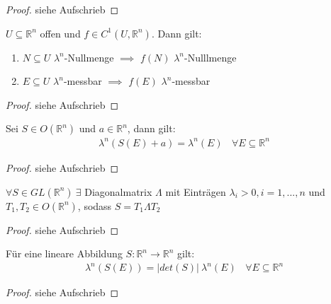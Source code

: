   \begin{proof}
    siehe Aufschrieb
  \end{proof}

  \begin{theorem}
    $U \subseteq \mathbb{R}^n$ offen und $f \in C^1(U, \mathbb{R}^n)$. Dann gilt:
    \begin{enumerate}
      \item $N \subseteq U$ $\lambda^n$-Nullmenge $\implies$ $f(N)$ $\lambda^n$-Nulllmenge
      \item $E \subseteq U$ $\lambda^n$-messbar $\implies$ $f(E)$ $\lambda^n$-messbar
    \end{enumerate}
  \end{theorem}

  \begin{proof}
    siehe Aufschrieb
  \end{proof}

  \begin{theorem}
    Sei $S \in O(\mathbb{R}^n)$ und $a \in \mathbb{R}^n$, dann gilt:
    \begin{align*}
      \lambda^n(S(E) + a) = \lambda^n(E) \ \ \ \ \forall E \subseteq \mathbb{R}^n
    \end{align*}
  \end{theorem}

  \begin{proof}
    siehe Aufschrieb
  \end{proof}

  \begin{lemma}[Polarzerlegung]
    $\forall S \in GL(\mathbb{R}^n) \ \exists$ Diagonalmatrix $\Lambda$ mit Einträgen $\lambda_i > 0, i=1,...,n$ und \\
    $T_1, T_2 \in O(\mathbb{R}^n)$, sodass $S = T_1 \Lambda T_2$ 
  \end{lemma}

  \begin{proof}
    siehe Aufschrieb
  \end{proof}

  \begin{theorem}
    Für eine lineare Abbildung $S: \mathbb{R}^n \to \mathbb{R}^n$ gilt:
    \begin{align*}
      \lambda^n(S(E)) = |det(S)| \ \lambda^n(E) \ \ \ \ \forall E \subseteq \mathbb{R}^n
    \end{align*}
  \end{theorem}

  \begin{proof}
    siehe Aufschrieb
  \end{proof}

